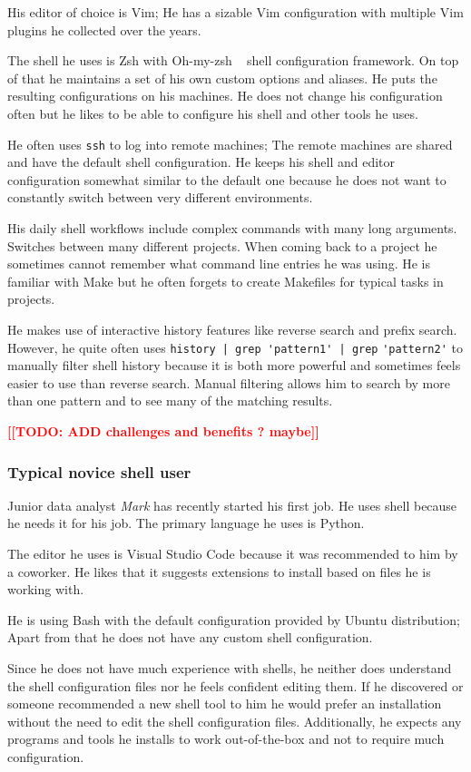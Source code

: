 \documentclass[thesis=M,english]{FITthesis}[2012/10/20]
\newcommand{\todotext}[1]{\textcolor{red}{\textbf{[[#1]]}}}
\let\myCite\cite
\renewcommand\cite{\unskip~\myCite}
\begin{document}
His editor of choice is Vim; He has a sizable Vim configuration with multiple Vim plugins he collected over the years.

The shell he uses is Zsh with Oh-my-zsh \cite{toolsohmyzsh} shell configuration framework. On top of that he maintains a set of his own custom options and aliases. He puts the resulting configurations on his machines. He does not change his configuration often but he likes to be able to configure his shell and other tools he uses.

He often uses \verb|ssh| to log into remote machines; The remote machines are shared and have the default shell configuration. He keeps his shell and editor configuration somewhat similar to the default one because he does not want to constantly switch between very different environments. 

His daily shell workflows include complex commands with many long arguments. Switches between many different projects. When coming back to a project he sometimes cannot remember what command line entries he was using. He is familiar with Make but he often forgets to create Makefiles for typical tasks in projects.

He makes use of interactive history features like reverse search and prefix search. However, he quite often uses \verb#history | grep 'pattern1' | grep# \verb#'pattern2'# to manually filter shell history because it is both more powerful and sometimes feels easier to use than reverse search. Manual filtering allows him to search by more than one pattern and to see many of the matching results. 

\todotext{TODO: ADD challenges and benefits ? maybe}

\subsubsection*{Typical novice shell user}

Junior data analyst \textit{Mark} has recently started his first job. He uses shell because he needs it for his job. The primary language he uses is Python. 

The editor he uses is Visual Studio Code because it was recommended to him by a coworker. He likes that it suggests extensions to install based on files he is working with.

He is using Bash with the default configuration provided by Ubuntu distribution; Apart from that he does not have any custom shell configuration. 

Since he does not have much experience with shells, he neither does understand the shell configuration files nor he feels confident editing them. If he discovered or someone recommended a new shell tool to him he would prefer an installation without the need to edit the shell configuration files. Additionally, he expects any programs and tools he installs to work out-of-the-box and not to require much configuration. 
\end{document}
